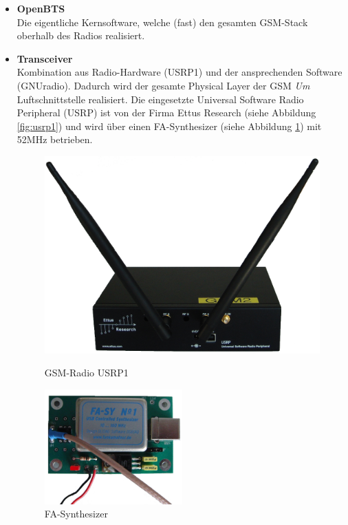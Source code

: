 \begin{itemize}
\item \textbf{OpenBTS}\\
Die eigentliche Kernsoftware, welche (fast) den gesamten GSM-Stack oberhalb des Radios realisiert.
\end{itemize}
\begin{itemize}
\item \textbf{Transceiver}\\
Kombination aus Radio-Hardware (USRP1) und der ansprechenden Software (GNUradio). Dadurch wird der gesamte Physical Layer der GSM \textit{Um} Luftschnittstelle realisiert. Die eingesetzte Universal Software Radio Peripheral (USRP) ist von der Firma Ettus Research (siehe Abbildung \ref{fig:usrp1}) und wird über einen FA-Synthesizer (siehe Abbildung \ref{fig:fasyn}) mit 52MHz betrieben.
\begin{figure}[htbp]
  \centering
  \begin{minipage}[b]{6cm}
    \centering
    \includegraphics[width=1.00\textwidth]{img/usrp1.png}
    \caption{GSM-Radio USRP1}
	\label{fig:usrp1}
  \end{minipage}
  \begin{minipage}[b]{2cm}
  \end{minipage}
  \begin{minipage}[b]{6cm}
    \centering
    \includegraphics[width=0.50\textwidth]{img/frequenzgen.png}
    \caption{FA-Synthesizer}
	\label{fig:fasyn}
  \end{minipage}
\end{figure}
\end{itemize}
